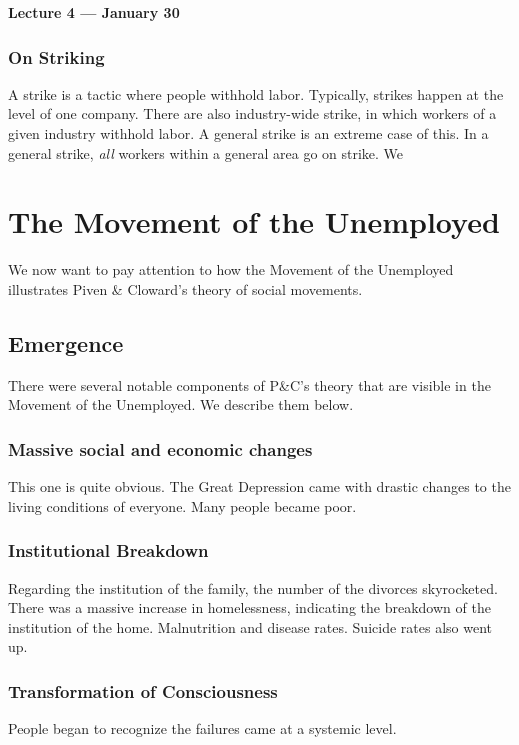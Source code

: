 \vspace{3mm}
\noindent \textbf{Lecture 4 --- January 30\th}

\subsubsection{On Striking}
A strike is a tactic where people withhold labor.
Typically, strikes happen at the level of one company.
There are also industry-wide strike, in which workers of a given industry withhold labor.
A general strike is an extreme case of this.
In a general strike, \textit{all} workers within a general area go on strike.
We

\section{The Movement of the Unemployed}
We now want to pay attention to how the Movement of the Unemployed illustrates Piven \& Cloward's theory of social movements.

\subsection{Emergence}
There were several notable components of P\&C's theory that are visible in the Movement of the Unemployed.
We describe them below.

\subsubsection{Massive social and economic changes}
This one is quite obvious.
The Great Depression came with drastic changes to the living conditions of everyone.
Many people became poor.


\subsubsection{Institutional Breakdown}
Regarding the institution of the family, the number of the divorces skyrocketed.
There was a massive increase in homelessness, indicating the breakdown of the institution of the home.
Malnutrition and disease rates.
Suicide rates also went up.

\subsubsection{Transformation of Consciousness}
People began to recognize the failures came at a systemic level.

